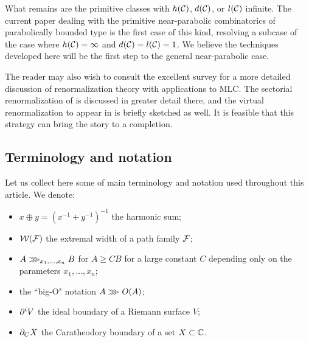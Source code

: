 \documentclass[12pt]{amsart}
\begin{document}
What remains are the primitive classes with $h(\mathcal C)$, $d(\mathcal C)$, or $l(\mathcal C)$ infinite.
The current paper dealing with the primitive near-parabolic combinatorics of  
parabolically bounded type is the first case of this kind, 
resolving a subcase of the case where $h(\mathcal C) = \infty$ and $d(\mathcal C) = l(\mathcal C)=1$.
We believe the techniques developed here will be the first step to the general near-parabolic case.

The reader may also wish to consult the excellent survey \cite{dudkoMLC} for a more detailed discussion of renormalization theory with applications to MLC. 
The sectorial renormalization of \cite{DLneutral} is discussed in greater detail there, 
and the virtual renormalization to appear in \cite{DKL:virtual} is briefly sketched as well.
{It is feasible that this strategy can bring the story to a completion.}





\subsection{Terminology and notation}
Let us collect here some of main terminology and notation used throughout this article. 
We denote:
\begin{itemize}
    \item $x\oplus y= (x^{-1}+y^{-1})^{-1}$ the harmonic sum; 
    \item $\mathcal W(\mathcal F)$ the extremal width of a path family $\mathcal F$;
    \item $A\ggg_{x_1, \dots, x_n}B$ for $A\geq C B$ for a large constant $C$ depending only on the parameters $x_1, \dots, x_n$;
    \item the ``big-O" notation $A\ggg_{}O(A)$;
    \item $\partial^i V$ the ideal boundary of a Riemann surface $V$;
    \item $\partial_C X$ the Caratheodory boundary of a set $X\subset \mathbb C$.
\end{itemize}
\end{document}
